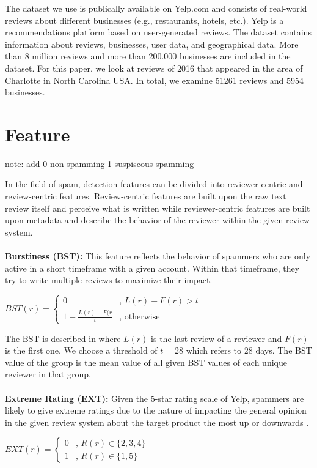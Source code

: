 \documentclass[conference]{IEEEtran}  %
\theoremstyle{plain}
\theoremstyle{definition}
\theoremstyle{remark}
\begin{document}
The dataset we use is publically available on Yelp.com and consists of real-world reviews about different businesses (e.g., restaurants, hotels, etc.). Yelp is a recommendations platform based on user-generated reviews. The dataset contains information about reviews, businesses, user data, and geographical data. More than 8 million reviews and more than 200.000 businesses are included in the dataset. For this paper, we look at reviews of 2016 that appeared in the area of Charlotte in North Carolina USA. In total, we examine 51261 reviews and 5954 businesses.  

\section{Feature}
\label{sec:feature}

note: add 0 non spamming 1 suspiscous spamming

In the field of spam, detection features can be divided into reviewer-centric and review-centric features.  Review-centric features are built upon the raw text review itself and perceive what is written while reviewer-centric features are built upon metadata and describe the behavior of the reviewer within the given review system. 
\\
\\
\textbf{Burstiness (BST):} This feature reflects the behavior of spammers who are only active in a short timeframe with a given account. Within that timeframe, they try to write multiple reviews to maximize their impact. 

$
{BST(r)} = \begin{cases}
    0 & \text{, } L(r)-F(r) > t \\
    1 - \frac{L(r)-F(r}{t} & \text{, otherwise}
\end{cases}
$

The BST is described in \cite{xu2019cpm} where $L(r)$ is the last review of a reviewer and $F(r)$ is the first one. We choose a threshold of $t=28$ which refers to 28 days. 
The BST value of the group is the mean value of all given BST values of each unique reviewer in that group. 
\\
\\
\textbf{Extreme Rating (EXT):}
Given the 5-star rating scale of Yelp, spammers are likely to give extreme ratings due to the nature of impacting the general opinion in the given review system about the target product the most up or downwards \cite{mukherjee2013spotting}.

$
{EXT(r)} = \begin{cases}
    0 & \text{, } R(r) \in \{ 2,3,4 \} \\
    1 & \text{, } R(r) \in \{ 1,5 \}
\end{cases}
$
\end{document}
